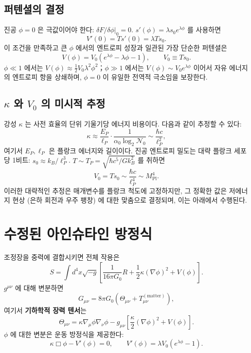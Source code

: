 \documentclass[12pt,a4paper]{article}
\begin{document}
	\subsection{퍼텐셜의 결정}
	진공 \(\phi=0\) 은 극값이어야 한다: \(\delta F/\delta\phi|_0 = 0\). \(s'(\phi) = \lambda s_0 e^{\lambda\phi}\) 를 사용하면
	\[
	V'(0) = T s'(0) = \lambda T s_0.
	\]
	이 조건을 만족하고 큰 \(\phi\) 에서의 엔트로피 성장과 일관된 가장 단순한 퍼텐셜은
	\begin{equation}
		\boxed{V(\phi) = V_0 \left( e^{\lambda\phi} - \lambda\phi - 1 \right), \qquad V_0 \equiv T s_0.}
		\label{eq:V}
	\end{equation}
	\(\phi \ll 1\) 에서는 \(V(\phi) \approx \frac12 V_0 \lambda^2 \phi^2\)；\(\phi \gg 1\) 에서는 \(V(\phi) \sim V_0 e^{\lambda\phi}\) 이어서 자유 에너지의 엔트로피 항을 상쇄하며, \(\phi=0\) 이 유일한 전역적 극소임을 보장한다.
	
	\subsection{\(\kappa\) 와 \(V_0\) 의 미시적 추정}
	강성 \(\kappa\) 는 사전 효율의 단위 기울기당 에너지 비용이다. 다음과 같이 추정할 수 있다:
	\[
	\kappa \approx \frac{E_P}{\ell_P} \cdot \frac{1}{\alpha_0 \log_2 \mathcal{N}_0} \sim \frac{\hbar c}{\ell_P^2},
	\]
	여기서 \(E_P, \ell_P\) 은 플랑크 에너지와 길이이다. 진공 엔트로피 밀도는 대략 플랑크 세포당 1비트: \(s_0 \approx k_B / \ell_P^3\). \(T \sim T_P = \sqrt{\hbar c^5 / G k_B^2}\) 를 취하면
	\[
	V_0 = T s_0 \sim \frac{\hbar c}{\ell_P^4} \sim M_{\mathrm{Pl}}^4.
	\]
	이러한 대략적인 추정은 매개변수를 플랑크 척도에 고정하지만, 그 정확한 값은 저에너지 현상 (은하 회전과 우주 팽창) 에 대한 맞춤으로 결정되며, 이는 아래에서 수행된다.
	
	\section{수정된 아인슈타인 방정식}
	
	조정장을 중력에 결합시키면 전체 작용은
	\begin{equation}
		S = \int d^4x \sqrt{-g} \left[ \frac{1}{16\pi G_0} R + \frac{1}{2}\kappa (\nabla\phi)^2 + V(\phi) \right].
		\label{eq:action}
	\end{equation}
	\(g^{\mu\nu}\) 에 대해 변분하면
	\begin{equation}
		G_{\mu\nu} = 8\pi G_0 \left( \Theta_{\mu\nu} + T_{\mu\nu}^{(\mathrm{matter})} \right),
		\label{eq:einstein}
	\end{equation}
	여기서 \textbf{기하학적 장력 텐서}는
	\begin{equation}
		\Theta_{\mu\nu} = \kappa \nabla_\mu \phi \nabla_\nu \phi - g_{\mu\nu} \left[ \frac{\kappa}{2} (\nabla\phi)^2 + V(\phi) \right].
		\label{eq:Theta}
	\end{equation}
	\(\phi\) 에 대한 변분은 운동 방정식을 제공한다:
	\begin{equation}
		\kappa \Box \phi - V'(\phi) = 0, \qquad V'(\phi) = \lambda V_0 \left( e^{\lambda\phi} - 1 \right).
		\label{eq:phieom}
	\end{equation}
	
\end{document}
